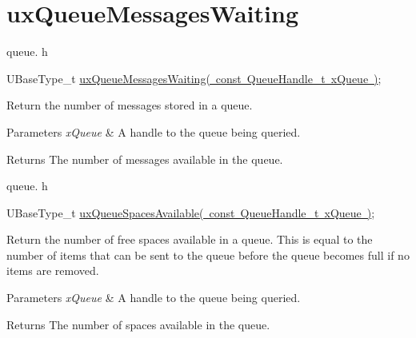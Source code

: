 \hypertarget{group__ux_queue_messages_waiting}{}\section{ux\+Queue\+Messages\+Waiting}
\label{group__ux_queue_messages_waiting}
queue. h 
\begin{DoxyPre}UBaseType\_t \mbox{\hyperlink{queue_8h_add7ee0701ba35904d190811b9e5a4eda}{uxQueueMessagesWaiting( const QueueHandle\_t xQueue )}};\end{DoxyPre}


Return the number of messages stored in a queue.


\begin{DoxyParams}{Parameters}
{\em x\+Queue} & A handle to the queue being queried.\\
\hline
\end{DoxyParams}
\begin{DoxyReturn}{Returns}
The number of messages available in the queue.
\end{DoxyReturn}
queue. h 
\begin{DoxyPre}UBaseType\_t \mbox{\hyperlink{queue_8h_aae75791e91707c1e0bb31d761921531c}{uxQueueSpacesAvailable( const QueueHandle\_t xQueue )}};\end{DoxyPre}


Return the number of free spaces available in a queue. This is equal to the number of items that can be sent to the queue before the queue becomes full if no items are removed.


\begin{DoxyParams}{Parameters}
{\em x\+Queue} & A handle to the queue being queried.\\
\hline
\end{DoxyParams}
\begin{DoxyReturn}{Returns}
The number of spaces available in the queue. 
\end{DoxyReturn}
